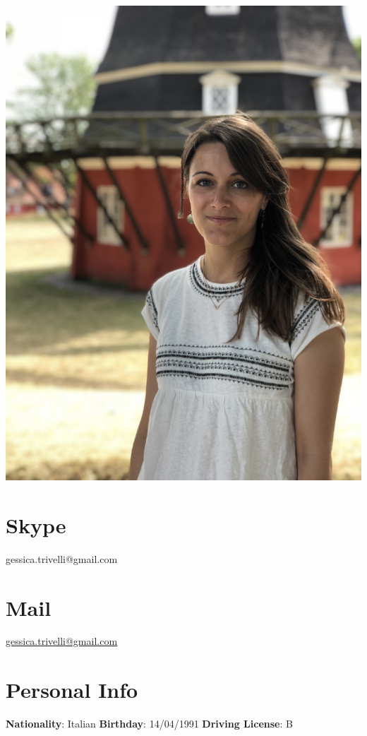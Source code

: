 \documentclass[11pt]{friggeri-cv}
\begin{document}
  \begin{aside}
    \includegraphics[width=0.95\columnwidth]{img/IMG_2838}
    \section{Skype}\footnotesize{
    gessica.trivelli@gmail.com}
    \section{Mail}\footnotesize{
    \href{mailto:gessica.trivelli@gmail.com}{gessica.trivelli@gmail.com}}
    \section{Personal Info}\footnotesize{
      \textbf{Nationality}:
      Italian
      \textbf{Birthday}:
      14/04/1991
      \textbf{Driving License}:
      B}
  \end{aside}
\end{document}
